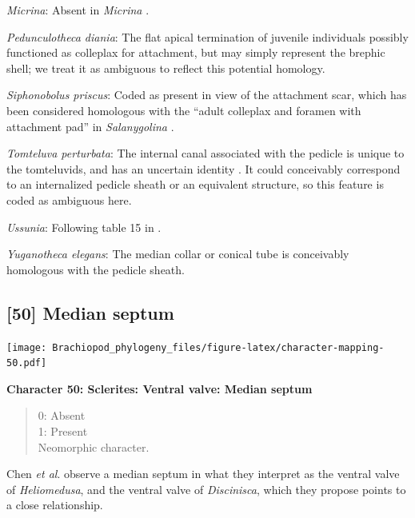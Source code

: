 \documentclass[openany]{book}
\theoremstyle{definition}
\theoremstyle{definition}
\theoremstyle{definition}
\theoremstyle{remark}
\begin{document}
\hypertarget{Micrina-coding-49}{}
\emph{Micrina}: Absent in \emph{Micrina} \citep{Holmer2011Firstrecord}.

\hypertarget{Pedunculotheca_diania-coding-49}{}
\emph{Pedunculotheca diania}: The flat apical termination of juvenile
individuals possibly functioned as colleplax for attachment, but may
simply represent the brephic shell; we treat it as ambiguous to reflect
this potential homology.

\hypertarget{Siphonobolus_priscus-coding-49}{}
\emph{Siphonobolus priscus}: Coded as present in view of the attachment
scar, which has been considered homologous with the ``adult colleplax
and foramen with attachment pad'' in \emph{Salanygolina}
\citep{Popov2009Earlyontogeny}.

\hypertarget{Tomteluva_perturbata-coding-49}{}
\emph{Tomteluva perturbata}: The internal canal associated with the
pedicle is unique to the tomteluvids, and has an uncertain identity
\citep{Streng2016Anew}. It could conceivably correspond to an
internalized pedicle sheath or an equivalent structure, so this feature
is coded as ambiguous here.

\hypertarget{Ussunia-coding-49}{}
\emph{Ussunia}: Following table 15 in
\citet{Williams2000LinguliformeaCraniiformea}.

\hypertarget{Yuganotheca_elegans-coding-49}{}
\emph{Yuganotheca elegans}: The median collar or conical tube is
conceivably homologous with the pedicle sheath.

\subsection*{{[}50{]} Median septum}\label{median-septum}

\texttt{[image: Brachiopod\_phylogeny\_files/figure-latex/character-mapping-50.pdf]}

\textbf{Character 50: Sclerites: Ventral valve: Median septum}

\begin{quote}
0: Absent\\
1: Present\\
Neomorphic character.
\end{quote}

Chen \emph{et al}. \citeyearpar{Chen2007Reinterpretationof} observe a
median septum in what they interpret as the ventral valve of
\emph{Heliomedusa}, and the ventral valve of \emph{Discinisca}, which
they propose points to a close relationship.
\end{document}
